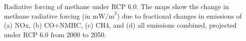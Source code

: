 Radiative forcing of methane under RCP 6.0. The maps show the change in methane radiative forcing (in $\mathrm{mW/m}^2$) due to fractional changes in emissions of (a) NOx, (b) CO+NMHC, (c) CH4, and (d) all emissions combined, projected under RCP 6.0 from 2000 to 2050. \label{fig:eqems}